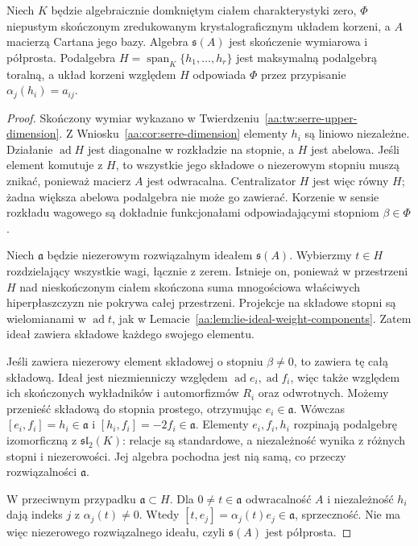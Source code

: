\begin{twierdzenie}
\label{aa:tw:serre-existence}
Niech $K$ będzie algebraicznie domkniętym ciałem charakterystyki zero, $\Phi$ niepustym skończonym zredukowanym krystalograficznym układem korzeni, a $A$ macierzą Cartana jego bazy. Algebra $\mathfrak s(A)$ jest skończenie wymiarowa i półprosta. Podalgebra $H=\operatorname{span}_K\{h_1,\ldots,h_r\}$ jest maksymalną podalgebrą toralną, a układ korzeni względem $H$ odpowiada $\Phi$ przez przypisanie $\alpha_j(h_i)=a_{ij}$.
\end{twierdzenie}
\begin{proof}
Skończony wymiar wykazano w Twierdzeniu~\ref{aa:tw:serre-upper-dimension}. Z Wniosku~\ref{aa:cor:serre-dimension} elementy $h_i$ są liniowo niezależne. Działanie $\operatorname{ad}H$ jest diagonalne w rozkładzie na stopnie, a $H$ jest abelowa. Jeśli element komutuje z $H$, to wszystkie jego składowe o niezerowym stopniu muszą znikać, ponieważ macierz $A$ jest odwracalna. Centralizator $H$ jest więc równy $H$; żadna większa abelowa podalgebra nie może go zawierać. Korzenie w sensie rozkładu wagowego są dokładnie funkcjonałami odpowiadającymi stopniom $\beta\in\Phi$.

Niech $\mathfrak a$ będzie niezerowym rozwiązalnym ideałem $\mathfrak s(A)$. Wybierzmy $t\in H$ rozdzielający wszystkie wagi, łącznie z zerem. Istnieje on, ponieważ w przestrzeni $H$ nad nieskończonym ciałem skończona suma mnogościowa właściwych hiperpłaszczyzn nie pokrywa całej przestrzeni. Projekcje na składowe stopni są wielomianami w $\operatorname{ad}t$, jak w Lemacie~\ref{aa:lem:lie-ideal-weight-components}. Zatem ideał zawiera składowe każdego swojego elementu.

Jeśli zawiera niezerowy element składowej o stopniu $\beta\ne0$, to zawiera tę całą składową. Ideał jest niezmienniczy względem $\operatorname{ad}e_i,\operatorname{ad}f_i$, więc także względem ich skończonych wykładników i automorfizmów $R_i$ oraz odwrotnych. Możemy przenieść składową do stopnia prostego, otrzymując $e_i\in\mathfrak a$. Wówczas $[e_i,f_i]=h_i\in\mathfrak a$ i $[h_i,f_i]=-2f_i\in\mathfrak a$. Elementy $e_i,f_i,h_i$ rozpinają podalgebrę izomorficzną z $\mathfrak{sl}_2(K)$: relacje są standardowe, a niezależność wynika z różnych stopni i niezerowości. Jej algebra pochodna jest nią samą, co przeczy rozwiązalności $\mathfrak a$.

W przeciwnym przypadku $\mathfrak a\subset H$. Dla $0\ne t\in\mathfrak a$ odwracalność $A$ i niezależność $h_i$ dają indeks $j$ z $\alpha_j(t)\ne0$. Wtedy $[t,e_j]=\alpha_j(t)e_j\in\mathfrak a$, sprzeczność. Nie ma więc niezerowego rozwiązalnego ideału, czyli $\mathfrak s(A)$ jest półprosta.


\end{proof}
